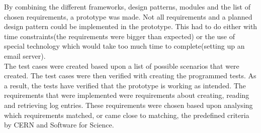 \documentclass[paper=a4, fontsize=11pt,twoside]{scrartcl}	%
\begin{document}
By combining the different frameworks, design patterns, modules and the list of chosen requirements, a prototype was made. Not all requirements and a planned design pattern could be implemented in the prototype. This had to do either with time constraints(the requirements were bigger than expected) or the use of special technology which would take too much time to complete(setting up an email server). \\
The test cases were created based upon a list of possible scenarios that were created. The test cases were then verified with creating the  programmed tests. As a result, the tests have verified that the prototype is working as intended.  
The requirements that were implemented were requirements about creating, reading and retrieving log entries. These requirements were chosen based upon analysing which requirements matched, or came close to matching, the predefined criteria by CERN and Software for Science. 


\newpage
\end{document}
